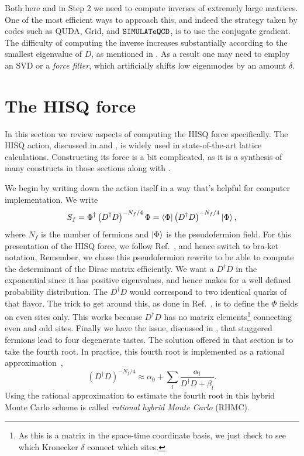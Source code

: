 Both here and in Step 2 we need to compute inverses of extremely
large matrices. One of the most efficient ways to approach this,
and indeed the strategy taken by codes such as 
QUDA, 
Grid, and
$\texttt{SIMULATeQCD}$, is to use the conjugate gradient.
The difficulty of computing the inverse increases
substantially according to the smallest eigenvalue of $D$,
as mentioned in . As a result
one may need to employ an SVD or a
{\it force filter}, which artificially
shifts low eigenmodes by an amount $\delta$.

\section{The HISQ force}\label{sec:HISQforce}

In this section we review aspects of computing the HISQ force specifically.
The HISQ action, discussed in  and ,
is widely used in state-of-the-art lattice calculations. Constructing its
force is a bit complicated, as it is a synthesis of many constructs in
those sections along with . 

We begin by writing down the action itself in a way that's helpful
for computer implementation. We write
\begin{equation}
S_f=\Phi^\dagger\left(D^\dagger D\right)^{-N_f/4}\Phi
=\bra{\Phi}\left(D^{\dagger} D\right)^{-N_f/4}\ket{\Phi},
\end{equation}
where $N_f$ is the number of fermions and $\ket\Phi$ is the pseudofermion field.
For this presentation of the HISQ force, we follow
Ref.~\cite{Wong:2007uz}, and hence switch to bra-ket notation.
Remember, we chose this pseudofermion rewrite to be able to compute the
determinant of the Dirac matrix efficiently. We want a
$D^\dagger D$ in the exponential since it has positive eigenvalues,
and hence makes for a well defined probability distribution.
The $D^\dagger D$ would correspond to two identical quarks of that flavor.
The trick to get around this, as done in 
Ref.~\cite{gottlieb_hybrid-molecular-dynamics_1987}, is to define the
$\Phi$ fields on even sites only. This works because $D^\dagger D$ has no
matrix elements\footnote{As this is a matrix in the space-time coordinate
basis, we just check to see which Kronecker $\delta$ connect which sites.} 
connecting even and odd sites. Finally we have the issue, discussed in
, that staggered fermions lead to four degenerate tastes.
The solution offered in that section is to take the fourth root. In practice,
this fourth root is implemented as a rational 
approximation~\cite{clark_rhmc_2004,clark_rational_2006},
\begin{equation}
\left(D^\dagger D\right)^{-N_f/4}\approx\alpha_0+\sum_l\frac{\alpha_l}{D^\dagger
D+\beta_l}.
\end{equation}
Using the rational approximation to estimate the fourth root in this hybrid
Monte Carlo scheme is called {\it rational hybrid Monte Carlo}
(RHMC).


